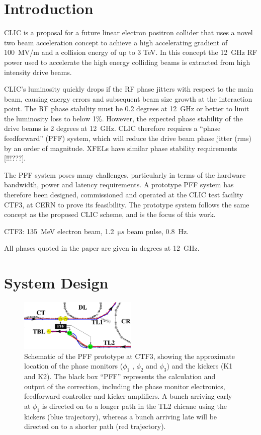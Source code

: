 \documentclass[%
 reprint,
 amsmath,amssymb,
 aps,
]{revtex4-1}
\begin{document}

\section{\label{s:intro}Introduction}

CLIC is a proposal for a future linear electron positron collider that uses a 
novel two 
beam acceleration concept to achieve a high accelerating gradient of 100~MV/m 
and a collision energy of up to 3 TeV. In this concept the 12~GHz RF power used 
to accelerate the high energy colliding beams is extracted from high intensity 
drive beams.

CLIC's luminosity quickly drops if the RF phase jitters with respect to the 
main beam, causing energy errors and subsequent beam size growth at the 
interaction point. The RF phase 
stability must be 0.2 degrees at 12~GHz or better to limit the luminosity loss 
to below 1\%.  However, the expected phase stability of the drive beams is 2 
degrees at 12~GHz. CLIC therefore requires a ``phase feedforward'' (PFF) 
system, which will reduce the drive beam phase jitter (rms) by an order of 
magnitude. XFELs have similar phase stability requirements [!!!???].

The PFF system poses many challenges, particularly in terms of the hardware 
bandwidth, power and latency requirements. A prototype PFF system has therefore 
been designed, commissioned and operated at the CLIC 
test facility CTF3, at CERN to prove its feasibility. The prototype system 
follows the same concept as the proposed CLIC scheme, and is the focus of this 
work. 

CTF3: 135~MeV electron beam, 1.2~\(\mathrm{\mu}s\) beam pulse, 0.8~Hz.

All phases quoted in the paper are given in degrees at 12~GHz.

\section{\label{s:ctfLayout}System Design}

\begin{figure}
	\includegraphics[width=0.5\textwidth]{figs/ctfpffLayout}%
	\caption{\label{fig:pffLayout}Schematic of the PFF prototype at CTF3, 
	showing the approximate location of the phase monitors (\(\phi_1\) , 
	\(\phi_2\) and \(\phi_3\)) and
		the kickers (K1 and K2). The black box “PFF” represents the calculation 
		and output of the correction, including the phase monitor
		electronics, feedforward controller and kicker amplifiers. A bunch 
		arriving early at \(\phi_1\) is directed on to a longer path in the TL2 
		chicane
		using the kickers (blue trajectory), whereas a bunch arriving late will 
		be directed on to a shorter path (red trajectory).}
\end{figure}
\end{document}

